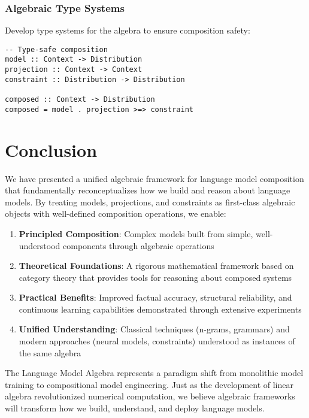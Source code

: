 \documentclass{article}
\theoremstyle{definition}
\begin{document}
\subsubsection{Algebraic Type Systems}
Develop type systems for the algebra to ensure composition safety:
\begin{lstlisting}
-- Type-safe composition
model :: Context -> Distribution
projection :: Context -> Context
constraint :: Distribution -> Distribution

composed :: Context -> Distribution
composed = model . projection >=> constraint
\end{lstlisting}

\section{Conclusion}

We have presented a unified algebraic framework for language model composition that fundamentally reconceptualizes how we build and reason about language models. By treating models, projections, and constraints as first-class algebraic objects with well-defined composition operations, we enable:

\begin{enumerate}
    \item \textbf{Principled Composition}: Complex models built from simple, well-understood components through algebraic operations

    \item \textbf{Theoretical Foundations}: A rigorous mathematical framework based on category theory that provides tools for reasoning about composed systems

    \item \textbf{Practical Benefits}: Improved factual accuracy, structural reliability, and continuous learning capabilities demonstrated through extensive experiments

    \item \textbf{Unified Understanding}: Classical techniques (n-grams, grammars) and modern approaches (neural models, constraints) understood as instances of the same algebra
\end{enumerate}

The Language Model Algebra represents a paradigm shift from monolithic model training to compositional model engineering. Just as the development of linear algebra revolutionized numerical computation, we believe algebraic frameworks will transform how we build, understand, and deploy language models.
\end{document}
